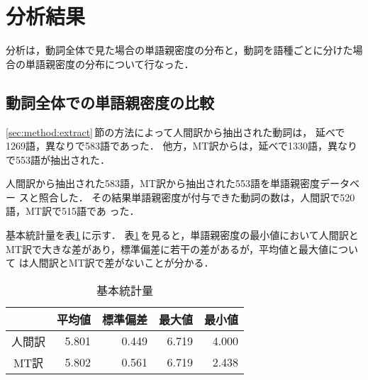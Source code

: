 \section{分析結果}
\label{sec:result}

分析は，動詞全体で見た場合の単語親密度の分布と，動詞を語種ごとに分けた場
合の単語親密度の分布について行なった．

\subsection{動詞全体での単語親密度の比較}
\label{sec:result:global}

\ref{sec:method:extract}\,節の方法によって人間訳から抽出された動詞は，
延べで1269語，異なりで583語であった．
他方，MT訳からは，延べで1330語，異なりで553語が抽出された．

人間訳から抽出された583語，MT訳から抽出された553語を単語親密度データベー
スと照合した．
その結果単語親密度が付与できた動詞の数は，人間訳で520語，MT訳で515語であ
った．

基本統計量を表\ref{tab:stat-kotonari}\,に示す．
表\ref{tab:stat-kotonari}\,を見ると，単語親密度の最小値において人間訳と
MT訳で大きな差があり，標準偏差に若干の差があるが，平均値と最大値について
は人間訳とMT訳で差がないことが分かる．
\begin{table}[htbp]
\caption{基本統計量} 
\label{tab:stat-kotonari}
\begin{center}
\begin{tabular}{|c||r|r|r|r|}\hline
 & \multicolumn{1}{c|}{平均値} &
\multicolumn{1}{c|}{標準偏差} & \multicolumn{1}{c|}{最大値} & 
\multicolumn{1}{c|}{最小値} \\\hline\hline
人間訳 & 5.801 & 0.449 & 6.719 & 4.000  \\
MT訳   & 5.802 & 0.561 & 6.719 & 2.438  \\\hline
\end{tabular}
\end{center}
\end{table}

